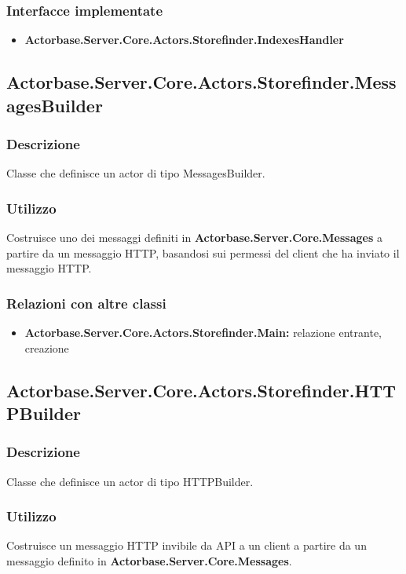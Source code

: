 \documentclass[a4paper]{article}
\begin{document}
			\subsubsection{Interfacce implementate}
			\begin{itemize}
				\item \textbf{Actorbase.Server.Core.Actors.Storefinder.IndexesHandler} 
			\end{itemize}

		\subsection{Actorbase.Server.Core.Actors.Storefinder.MessagesBuilder}
			\subsubsection{Descrizione}
				Classe che definisce un actor di tipo MessagesBuilder.
			\subsubsection{Utilizzo}
				Costruisce uno dei messaggi definiti in \textbf{Actorbase.Server.Core.Messages} a partire da un messaggio HTTP, basandosi sui permessi del client che ha inviato il messaggio HTTP.
			\subsubsection{Relazioni con altre classi}
			\begin{itemize}
				\item \textbf{Actorbase.Server.Core.Actors.Storefinder.Main:} relazione entrante, creazione
			\end{itemize}

		\subsection{Actorbase.Server.Core.Actors.Storefinder.HTTPBuilder}
			\subsubsection{Descrizione}
				Classe che definisce un actor di tipo HTTPBuilder.
			\subsubsection{Utilizzo}
				Costruisce un messaggio HTTP invibile da API a un client a partire da un messaggio definito in \textbf{Actorbase.Server.Core.Messages}.
\end{document}
